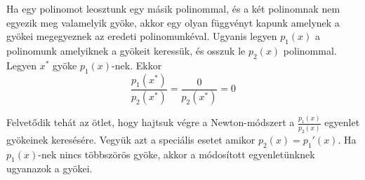 \documentclass[a4paper,12pt]{report}
\begin{document}
			Ha egy polinomot leosztunk egy másik polinommal, és a két polinomnak nem egyezik meg valamelyik gyöke, akkor egy olyan függvényt kapunk amelynek a gyökei megegyeznek az eredeti polinomunkéval. Ugyanis legyen $p_1(x)$ a polinomunk amelyiknek a gyökeit keressük, és osszuk le $p_2(x)$ polinommal. Legyen $x^*$ gyöke $p_1(x)$-nek. Ekkor
			\[ \frac{p_1(x^*)}{p_2(x^*)}=\frac{0}{p_2(x^*)}=0\]
			
			Felvetődik tehát az ötlet, hogy hajtsuk végre a Newton-módszert a $\frac{p_1(x)}{p_2(x)}$ egyenlet gyökeinek keresésére. Vegyük azt a speciális esetet amikor $p_2(x)=p_1'(x)$. Ha $p_1(x)$-nek nincs többszörös gyöke, akkor a módosított egyenletünknek ugyanazok a gyökei.
			\begin{figure}[htp]
           		\hfill
                \caption{}
           	\end{figure}
            
    

        
            
\end{document}
